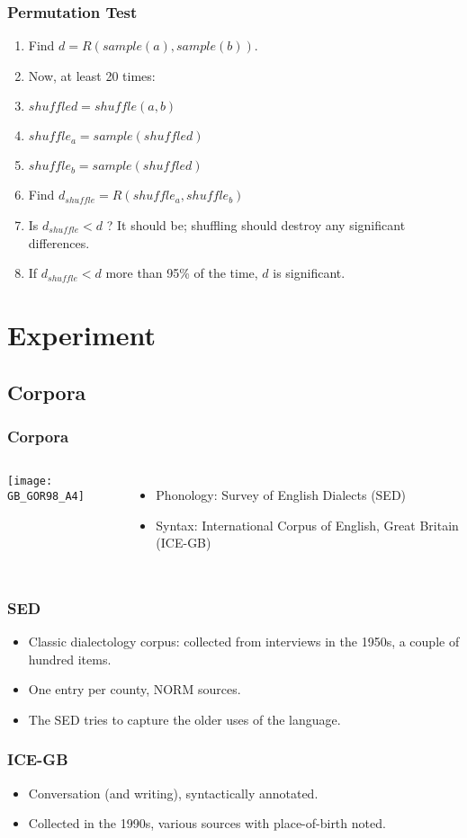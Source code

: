\documentclass{beamer}
\begin{document}
\begin{frame}
  \frametitle{Permutation Test}
  \begin{enumerate}
  \item Find $d = R(sample(a),sample(b))$.
  \item Now, at least 20 times:
  \item $shuffled = shuffle(a,b)$
  \item $shuffle_a = sample(shuffled)$
  \item $shuffle_b = sample(shuffled)$
  \item Find $d_{shuffle} = R(shuffle_a,shuffle_b)$
  \item Is $d_{shuffle} < d$ ? It should be; shuffling should destroy any significant differences.
  \item If $d_{shuffle} < d$ more than 95\% of the time, $d$ is significant.
  \end{enumerate}
\end{frame}
\section{Experiment}
\subsection{Corpora}
\begin{frame}
  \frametitle{Corpora}
  \begin{columns}
  \texttt{[image: GB\_GOR98\_A4]}
  \begin{itemize}
  \item Phonology: Survey of English Dialects (SED)
  \item Syntax: International Corpus of English, Great Britain
    (ICE-GB)
  \end{itemize}
    \end{columns}
\end{frame}
\begin{frame}
  \frametitle{SED}
  \begin{itemize}
  \item Classic dialectology corpus: collected from interviews in the
    1950s, a couple of hundred items.
  \item One entry per county, NORM sources.
  \item The SED tries to capture the older uses of the language.
  \end{itemize}
\end{frame}
\begin{frame}
  \frametitle{ICE-GB}
  \begin{itemize}
  \item Conversation (and writing), syntactically annotated.
  \item Collected in the 1990s, various sources with place-of-birth noted.
  \end{itemize}
\end{frame}
\end{document}
